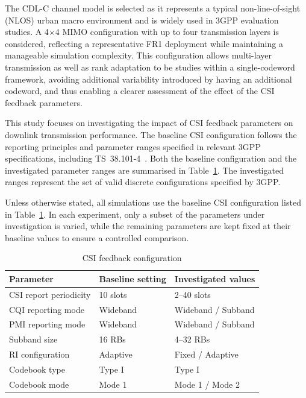 \documentclass[a4paper,12pt,onecolumn]{article}
\begin{document}
	The CDL-C channel model is selected as it represents a typical non-line-of-sight (NLOS) urban macro environment and is widely used in 3GPP evaluation studies. A 4$\times$4 MIMO configuration with up to four transmission layers is considered, reflecting a representative FR1 deployment while maintaining a manageable simulation complexity. This configuration allows multi-layer transmission as well as rank adaptation to be studies within a single-codeword framework, avoiding additional variability introduced by having an additional codeword, and thus enabling a clearer assessment of the effect of the CSI feedback parameters.
	
	
	This study focuses on investigating the impact of CSI feedback parameters on downlink transmission performance. The baseline CSI configuration follows the reporting principles and parameter ranges specified in relevant 3GPP specifications, including TS~38.101-4~\cite{3gpp_ts_38101_4}. Both the baseline configuration and the investigated parameter ranges are summarised in Table~\ref{tab:csi_config}. The investigated ranges represent the set of valid discrete configurations specified by 3GPP.
	
	Unless otherwise stated, all simulations use the baseline CSI configuration listed in Table~\ref{tab:csi_config}. In each experiment, only a subset of the parameters under investigation is varied, while the remaining parameters are kept fixed at their baseline values to ensure a controlled comparison.
	
	\begin{table}[h]
		\centering
		\caption{CSI feedback configuration}
		\label{tab:csi_config}
		\begin{tabular}{lll}
			\hline
			\textbf{Parameter} & \textbf{Baseline setting} & \textbf{Investigated values} \\
			\hline
			CSI report periodicity      & 10 slots & 2–40 slots \\
			CQI reporting mode          & Wideband & Wideband / Subband \\
			PMI reporting mode          & Wideband & Wideband / Subband \\
			Subband size                & 16 RBs   & 4–32 RBs \\
			RI configuration            & Adaptive & Fixed / Adaptive \\
			Codebook type               & Type I   & Type I \\
			Codebook mode               & Mode 1   & Mode 1 / Mode 2 \\
			\hline
		\end{tabular}
	\end{table}
	\vspace{-0.8cm}
\end{document}
